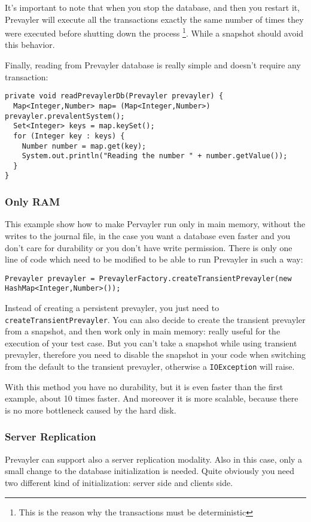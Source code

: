 			It's important to note that when you stop the database, and then you restart it, 
			Prevayler will execute all the transactions exactly
	 		the same number of times they were executed before shutting down the process \footnote{This is the reason 
	 		why the transactions must be deterministic}. While a snapshot should avoid this behavior.	
	 		
	 		Finally, reading from Prevayler database is really simple and doesn't require any transaction:
	 		\begin{lstlisting} 
private void readPrevaylerDb(Prevayler prevayler) {
  Map<Integer,Number> map= (Map<Integer,Number>) prevayler.prevalentSystem();
  Set<Integer> keys = map.keySet();
  for (Integer key : keys) {
    Number number = map.get(key);
    System.out.println("Reading the number " + number.getValue());
  }
}		
			\end{lstlisting}
	 		
	 		\subsubsection{Only RAM}
	 		This example show how to make Pervayler run only in main memory, without the writes to the journal file, 
	 		in the case you want a database even faster and you 
	 		don't care for durability or you don't have write permission. There is only one 
	 		line of code which need to be modified to be able to run Prevayler in such a way:	 		
	 		\begin{lstlisting} 
Prevayler prevayler = PrevaylerFactory.createTransientPrevayler(new HashMap<Integer,Number>());
			\end{lstlisting}
			
			Instead of creating a persistent prevayler, you just need to \lstinline!createTransientPrevayler!. 
			You can also decide to create the transient prevayler from a snapshot, and then work only in main memory: 
			really useful for the execution of your test case. But you can't take a snapshot while using 
			transient prevayler, therefore you need to disable the snapshot in your code when switching 
			from the default to the transient prevayler, otherwise a \lstinline!IOException! will raise.

			With this method you have no durability, but it is even faster than the first example, 
			about 10 times faster. And moreover it is more scalable, 
			because there is no more bottleneck caused by the hard disk. 			
	 		
	 		\subsubsection{Server Replication} \label{server-replication}
	 		Prevayler can support also a server replication modality. Also in this case, only a small 
	 		change to the database initialization is needed. Quite obviously you need two different kind of 
	 		initialization: server side and clients side.
	 		
